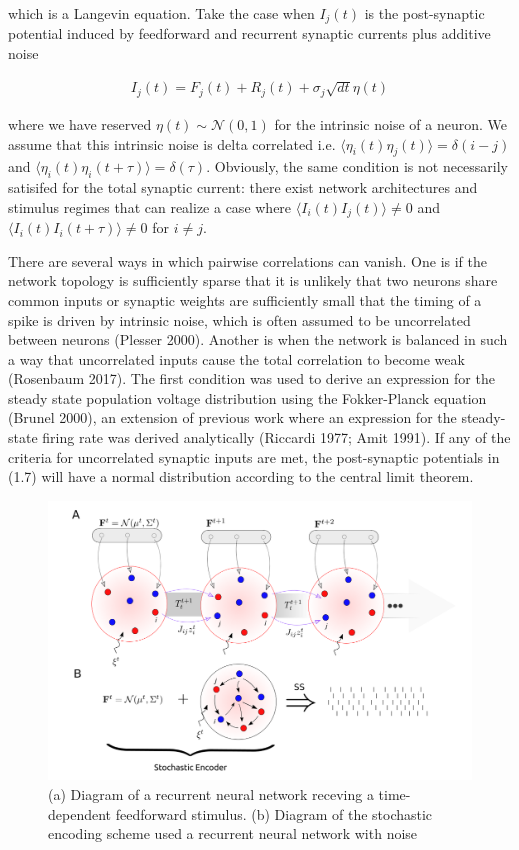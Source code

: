 \documentclass{ucetd}
\begin{document}
which is a Langevin equation. Take the case when $I_{j}(t)$ is the post-synaptic potential induced by feedforward and recurrent synaptic currents plus additive noise

\begin{align}
I_{j}(t) = F_{j}(t) + R_{j}(t) + \sigma_{j}\sqrt{dt}\eta(t)
\end{align}

where we have reserved $\eta(t) \sim \mathcal{N}(0,1)$ for the intrinsic noise of a neuron. We assume that this intrinsic noise is delta correlated i.e. $\langle \eta_{i}(t)\eta_{j}(t)\rangle = \delta(i-j)$ and $\langle \eta_{i}(t)\eta_{i}(t+\tau)\rangle = \delta(\tau)$. Obviously, the same condition is not necessarily satisifed for the total synaptic current: there exist network architectures and stimulus regimes that can realize a case where $\langle I_{i}(t)I_{j}(t)\rangle \neq 0$ and $\langle I_{i}(t)I_{i}(t+\tau)\rangle \neq 0$ for $i \neq j$.


There are several  ways in which pairwise correlations can vanish. One is if the network topology is sufficiently sparse that it is unlikely that two neurons share common inputs or synaptic weights are sufficiently small that the timing of a spike is driven by intrinsic noise, which is often assumed to be uncorrelated between neurons (Plesser 2000). Another is when the network is balanced in such a way that uncorrelated inputs cause the total correlation to become weak (Rosenbaum 2017). The first condition was used to derive an expression for the steady state population voltage distribution using the Fokker-Planck equation (Brunel 2000), an extension of previous work where an expression for the steady-state firing rate was derived analytically (Riccardi 1977; Amit 1991). If any of the criteria for uncorrelated synaptic inputs are met, the post-synaptic potentials in (1.7) will have a normal distribution according to the central limit theorem.


\begin{figure}[t!]
\centering
\includegraphics[width=150mm]{figure-1}
\caption{(a) Diagram of a recurrent neural network receving a time-dependent feedforward stimulus. (b) Diagram of the stochastic encoding scheme used a recurrent neural network with noise}
\end{figure}
\end{document}
